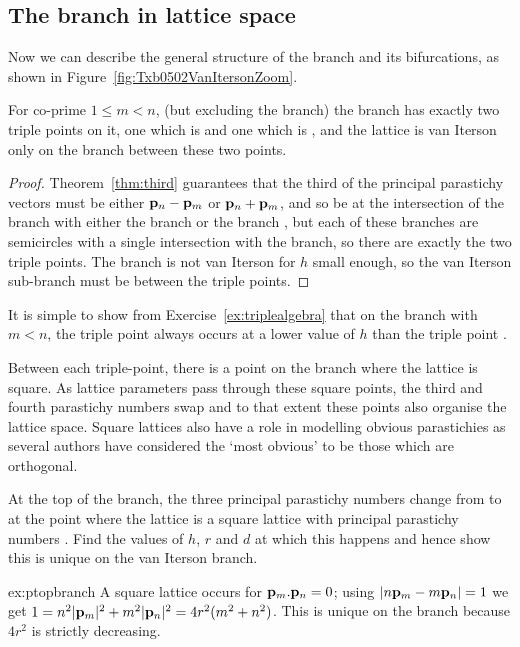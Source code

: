 \subsection{The  branch in lattice space}
Now we can describe the general structure of the  branch and its bifurcations, as shown in Figure~\ref{fig:Txb0502VanItersonZoom}.
\begin{theorem}
	For co-prime $1\leq m<n$,  (but excluding the  branch) the  branch has exactly two triple points on it, one which is  and one which is ,  and the lattice is van Iterson only on the branch between these two points.
\end{theorem}
\begin{proof}
	Theorem~\ref{thm:third} guarantees that the third of the principal parastichy vectors must be either ${\mathbf p}_{n}-{\mathbf p}_{m}$  or  ${\mathbf p}_{n}+{\mathbf p}_{m}$, 
	and so be at the intersection of the branch with either the branch   or the branch  , but each of these branches are semicircles with a single intersection with the  branch, so there are exactly the two triple points.  The  branch is not van Iterson for $h$ small enough, so the van Iterson sub-branch must be between the triple points. 
\end{proof}
It is simple to show from Exercise~\ref{ex:triplealgebra} that on the   branch with $m<n$, the triple point  always occurs at a lower value of $h$ than the triple point . 


Between each triple-point, there is a point on the branch where the lattice is square. 
As lattice parameters pass through these square points, the third and fourth parastichy numbers swap and to that extent these points also organise the lattice space. 
Square lattices also have a role in modelling obvious parastichies as several authors have considered the `most obvious' to be those which are orthogonal. 
\begin{jExercise}\label{ex:ptopbranch}
	At the top of the  branch, the three principal parastichy numbers change from  to  at the point where the lattice is a square lattice with principal parastichy numbers . Find the values of $h$, $r$ and $d$ at which this happens and hence show this is unique on the van Iterson branch.
\end{jExercise}
\begin{jAnswer}{ex:ptopbranch}
	A square lattice occurs for ${\mathbf p}_{m}.{\mathbf p}_{n}=0$; using $|n{\mathbf p}_{m}-m{\mathbf p}_{n}|=1$ we get
	$1=n^2|{\mathbf p}_{m}|^2+m^2|{\mathbf p}_{n}|^2= 4 r^2 ( m^2+n^2)$. This is unique on the branch because  $4r^2$ is strictly decreasing.
\end{jAnswer}
\newpage
